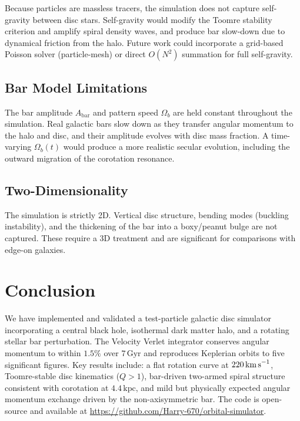 \documentclass[12pt, letterpaper]{article}
\begin{document}
Because particles are massless tracers, the simulation does not capture self-gravity between disc stars. Self-gravity would modify the Toomre stability criterion and amplify spiral density waves, and produce bar slow-down due to dynamical friction from the halo. Future work could incorporate a grid-based Poisson solver (particle-mesh) or direct $O(N^2)$ summation for full self-gravity.

\subsection{Bar Model Limitations}

The bar amplitude $A_\text{bar}$ and pattern speed $\Omega_b$ are held constant throughout the simulation. Real galactic bars slow down as they transfer angular momentum to the halo and disc, and their amplitude evolves with disc mass fraction. A time-varying $\Omega_b(t)$ would produce a more realistic secular evolution, including the outward migration of the corotation resonance.

\subsection{Two-Dimensionality}

The simulation is strictly 2D. Vertical disc structure, bending modes (buckling instability), and the thickening of the bar into a boxy/peanut bulge are not captured. These require a 3D treatment and are significant for comparisons with edge-on galaxies.

\section{Conclusion}
\label{sec:conclusion}

We have implemented and validated a test-particle galactic disc simulator incorporating a central black hole, isothermal dark matter halo, and a rotating stellar bar perturbation. The Velocity Verlet integrator conserves angular momentum to within $1.5\%$ over $7\,\text{Gyr}$ and reproduces Keplerian orbits to five significant figures. Key results include: a flat rotation curve at $220\,\text{km\,s}^{-1}$, Toomre-stable disc kinematics ($Q > 1$), bar-driven two-armed spiral structure consistent with corotation at $4.4\,\text{kpc}$, and mild but physically expected angular momentum exchange driven by the non-axisymmetric bar. The code is open-source and available at \url{https://github.com/Harry-670/orbital-simulator}.
\end{document}
